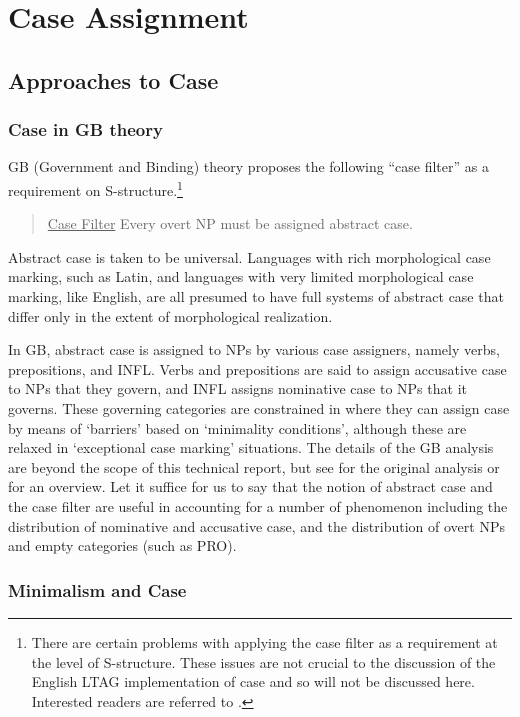 \section{Case Assignment}
\label{case-assignment}
\subsection{Approaches to Case}
\subsubsection{Case in GB theory}

GB (Government and Binding) theory proposes the following ``case filter'' as a
requirement on S-structure.\footnote{There are certain problems with applying
the case filter as a requirement at the level of S-structure.  These issues are
not crucial to the discussion of the English LTAG implementation of case and so
will not be discussed here.  Interested readers are referred to
\cite{lasnik-uriagereka88}.}

\begin{verse}
\underline{Case Filter}
Every overt NP must be assigned abstract case.
\end{verse}

Abstract case is taken to be universal.  Languages with rich morphological case
marking, such as Latin, and languages with very limited morphological case
marking, like English, are all presumed to have full systems of abstract case
that differ only in the extent of morphological realization.

In GB, abstract case is assigned to NPs by various case assigners, namely
verbs, prepositions, and INFL.  Verbs and prepositions are said to assign
accusative case to NPs that they govern, and INFL assigns nominative case to
NPs that it governs.  These governing categories are constrained in where they
can assign case by means of `barriers' based on `minimality conditions',
although these are relaxed in `exceptional case marking' situations.  The
details of the GB analysis are beyond the scope of this technical report, but
see \cite{chomsky86} for the original analysis or \cite{haegeman91} for an
overview.  Let it suffice for us to say that the notion of abstract case and
the case filter are useful in accounting for a number of phenomenon including
the distribution of nominative and accusative case, and the distribution of
overt NPs and empty categories (such as PRO).

\subsubsection{Minimalism and Case} 

